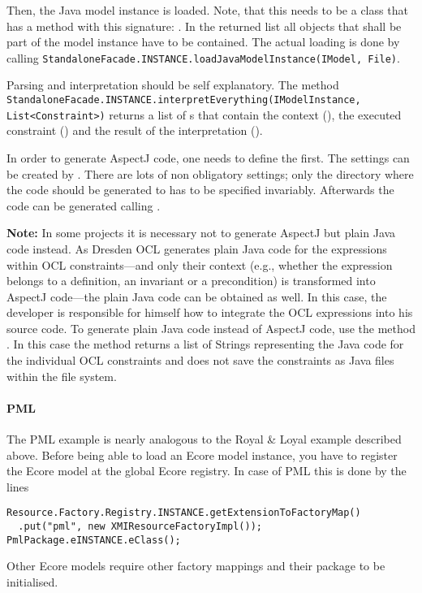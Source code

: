 Then, the Java model instance is loaded. Note, that this needs to be a class 
that has a method with this signature: . In the returned list all objects that shall be part of the 
model instance have to be contained. The actual loading is done by calling 
\lstinline[breaklines=true]{StandaloneFacade.INSTANCE.loadJavaModelInstance(IModel, File)}.

Parsing and interpretation should be self explanatory. The method 
\lstinline[breaklines=true]{StandaloneFacade.INSTANCE.interpretEverything(IModelInstance, List<Constraint>)} returns a list of
s that contain the context
(), the executed constraint ()
and the result of the interpretation ().

In order to generate AspectJ code, one needs to define the
 first. The settings can be created by 
. 
There are lots of non obligatory settings; only the directory where the code 
should be generated to has to be specified invariably. Afterwards the code can 
be generated calling 
. 

\textbf{Note:} In some projects it is necessary not to generate AspectJ but
plain Java code instead. As Dresden OCL generates plain Java code for the
expressions within OCL constraints---and only their context (e.g., whether the
expression belongs to a definition, an invariant or a precondition) is
transformed into AspectJ code---the plain Java code can be obtained as well. In
this case, the developer is responsible for himself how to integrate the OCL
expressions into his source code. To generate plain Java code instead of
AspectJ code, use the method
. In this case the method returns a list of
Strings representing the Java code for the individual OCL constraints and does
not save the constraints as Java files within the file system.

\paragraph{PML}
The PML example is nearly analogous to the Royal \& Loyal example described 
above. Before being able to load an Ecore model instance, you have to register 
the Ecore model at the global Ecore registry. In case of PML this is done by 
the lines
\lstset{language=Java}
\begin{lstlisting}
Resource.Factory.Registry.INSTANCE.getExtensionToFactoryMap()
  .put("pml", new XMIResourceFactoryImpl());
PmlPackage.eINSTANCE.eClass();
\end{lstlisting}
Other Ecore models require other factory mappings and their package to be 
initialised.


